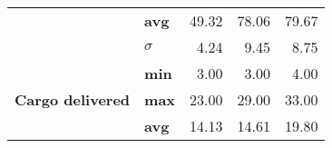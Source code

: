 \begin{table}[]
\begin{tabular}{llrrr}
                                               & \textbf{avg}        & 49.32                                                                                                                                             & 78.06                                                                                                                                             & 79.67                                                                                                                                           \\
                                               & \textbf{$ \sigma $} & 4.24                                                                                                                                              & 9.45                                                                                                                                              & 8.75                                                                                                                                            \\ \hline
\multirow{4}{*}{\textbf{Cargo delivered}}      & \textbf{min}        & 3.00                                                                                                                                              & 3.00                                                                                                                                              & 4.00                                                                                                                                            \\
                                               & \textbf{max}        & 23.00                                                                                                                                             & 29.00                                                                                                                                             & 33.00                                                                                                                                           \\
                                               & \textbf{avg}        & 14.13                                                                                                                                             & 14.61                                                                                                                                             & 19.80                                                                                                                                           \\

\end{tabular}
\end{table}
